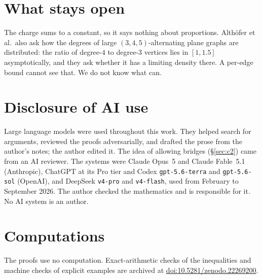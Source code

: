 \documentclass{amsart}
\theoremstyle{plain}
\theoremstyle{definition}
\theoremstyle{remark}
\begin{document}
\section{What stays open}

The charge sums to a constant, so it says nothing about proportions. Alth\"ofer
et al.\ also ask how the degrees of large $(3,4,5)$-alternating plane graphs are
distributed: the ratio of degree-$4$ to degree-$3$ vertices lies in $[1,1.5]$
asymptotically, and they ask whether it has a limiting density there. A per-edge
bound cannot see that. We do not know what can.

\section*{Disclosure of AI use}

Large language models were used throughout this work. They helped search for
arguments, reviewed the proofs adversarially, and drafted the prose from the
author's notes; the author edited it. The idea of allowing bridges
(\S\ref{sec:c2}) came from an AI reviewer. The systems were Claude Opus~5 and
Claude Fable~5.1 (Anthropic), ChatGPT at its Pro tier and Codex
\texttt{gpt-5.6-terra} and \texttt{gpt-5.6-sol} (OpenAI), and DeepSeek
\texttt{v4-pro} and \texttt{v4-flash}, used from February to September 2026. The
author checked the mathematics and is responsible for it. No AI system is an
author.

\section*{Computations}

The proofs use no computation. Exact-arithmetic checks of the inequalities and
machine checks of explicit examples are archived at
\href{https://doi.org/10.5281/zenodo.22269200}{doi:10.5281/zenodo.22269200}.
\end{document}
